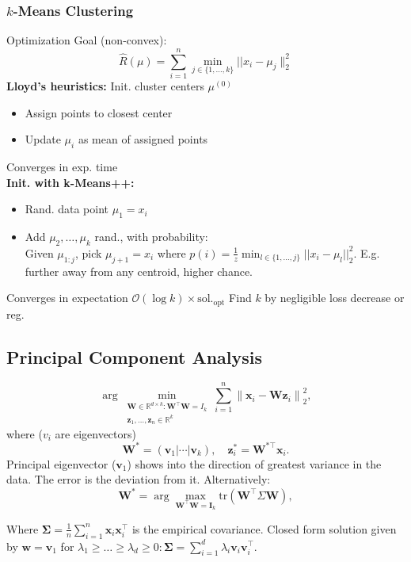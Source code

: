 \documentclass[a4paper,11pt]{article}
\begin{document}
\subsubsection*{$k$-Means Clustering}
Optimization Goal (non-convex):
$$
\textstyle \hat{R}(\mu)=\sum_{i=1}^n \min _{j \in\{1, \ldots, k\}}|| x_i-\mu_j \|_2^2
$$
\textbf{Lloyd's heuristics:} Init. cluster centers $\mu^{(0)}$
\begin{itemize}
    \item Assign points to closest center
    \item Update $\mu_i$ as mean of assigned points
\end{itemize}
Converges in exp. time\\
\textbf{Init. with k-Means++:}
\begin{itemize}
    \item Rand. data point $\mu_1=x_i$
    \item Add $\mu_2, \ldots, \mu_k$ rand., with probability:\\
    Given $\mu_{1:j}$, pick $\mu_{j+1}=x_i$ where $p(i)=\frac{1}{z} \min_{l \in \{1, \ldots, j\}} ||x_i-\mu_l||_2^2$. E.g. further away from any centroid, higher chance.
\end{itemize}
Converges in expectation $\mathcal{O}(\log k) \times \text{sol.}_\text{opt}$ 
Find $k$ by negligible loss decrease or reg.

\subsection*{Principal Component Analysis}
$$
\textstyle\arg \min _{\substack{\mathbf{W} \in \mathbb{R}^{d \times k}: 
\mathbf{W}^{\top}\mathbf{W}=I_k \\ \mathbf{z}_1, \ldots, \mathbf{z}_n \in 
\mathbb{R}^k}} \sum_{i=1}^n\left\|\mathbf{x}_i-\mathbf{W} 
\mathbf{z}_i\right\|_2^2,
$$
where ($v_{i}$ are eigenvectors)
$$
\mathbf{W}^{*}=\left(\mathbf{v}_1|\cdots| \mathbf{v}_k\right), \quad 
\mathbf{z}_i^{*}=\mathbf{W}^{*\top} \mathbf{x}_i .
$$
Principal eigenvector ($\mathbf{v}_{1}$) shows into the direction of greatest variance in the data. The error is the deviation from it. Alternatively:
$$ 
\mathbf{W}^* = \arg \max_{\mathbf{W}^{\top} \mathbf{W} = \mathbf{I}_k} \mathrm{tr}(\mathbf{W}^{\top} \Sigma \mathbf{W}),
$$

Where $\mathbf{\Sigma} = \frac{1}{n} \sum_{i=1}^n \mathbf{x}_i \mathbf{x}_i^{\top}$ is the empirical covariance. Closed form solution given by $\mathbf{w} = \mathbf{v}_1$ for $\lambda_1 \geq \ldots \geq \lambda_d \geq 0: \mathbf{\Sigma} = \sum_{i=1}^d \lambda_i \mathbf{v}_i \mathbf{v}_i^{\top}$.
\end{document}

